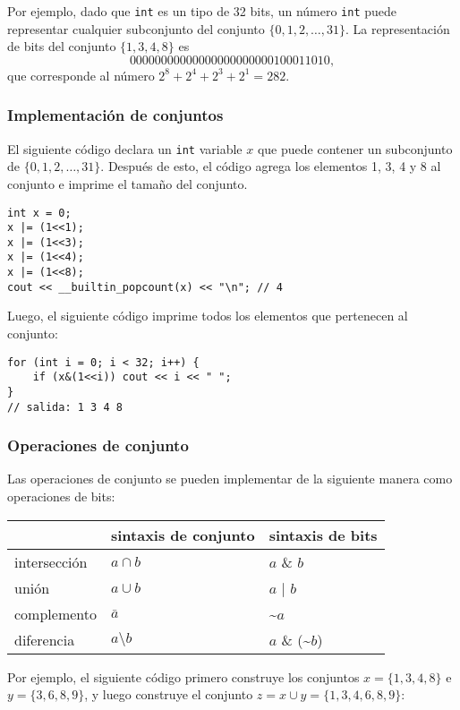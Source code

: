 Por ejemplo, dado que \texttt{int} es un tipo de 32 bits,
un número \texttt{int} puede representar cualquier subconjunto
del conjunto $\{0,1,2,\ldots,31\}$.
La representación de bits del conjunto $\{1,3,4,8\}$ es
\[00000000000000000000000100011010,\]
que corresponde al número $2^8+2^4+2^3+2^1=282$.

\subsubsection{Implementación de conjuntos}

El siguiente código declara un \texttt{int}
variable $x$ que puede contener
un subconjunto de $\{0,1,2,\ldots,31\}$.
Después de esto, el código agrega los elementos 1, 3, 4 y 8
al conjunto e imprime el tamaño del conjunto.
\begin{lstlisting}
int x = 0;
x |= (1<<1);
x |= (1<<3);
x |= (1<<4);
x |= (1<<8);
cout << __builtin_popcount(x) << "\n"; // 4
\end{lstlisting}
Luego, el siguiente código imprime todos
los elementos que pertenecen al conjunto:
\begin{lstlisting}
for (int i = 0; i < 32; i++) {
    if (x&(1<<i)) cout << i << " ";
}
// salida: 1 3 4 8
\end{lstlisting}

\subsubsection{Operaciones de conjunto}

Las operaciones de conjunto se pueden implementar de la siguiente manera como operaciones de bits:

\begin{center}
\begin{tabular}{lll}
& sintaxis de conjunto & sintaxis de bits \\
\hline
intersección & $a \cap b$ & $a$ \& $b$ \\
unión & $a \cup b$ & $a$ | $b$ \\
complemento & $\bar a$ & \textasciitilde$a$ \\
diferencia & $a \setminus b$ & $a$ \& (\textasciitilde$b$) \\
\end{tabular}
\end{center}

Por ejemplo, el siguiente código primero construye
los conjuntos $x=\{1,3,4,8\}$ e $y=\{3,6,8,9\}$,
y luego construye el conjunto $z = x \cup y = \{1,3,4,6,8,9\}$:

